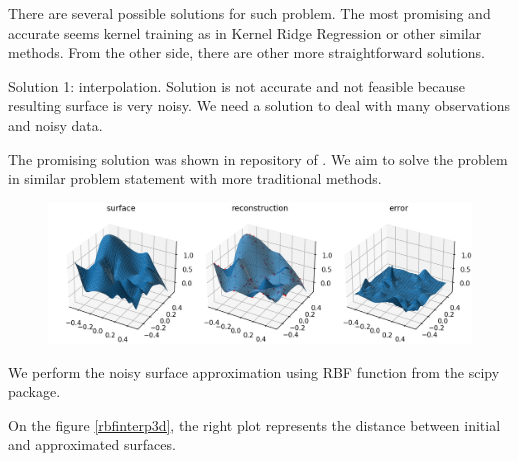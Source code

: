 \documentclass[a4paper, 12pt]{article}
\begin{document}
There are  several possible solutions for such problem. The most promising and accurate seems kernel training as in Kernel Ridge Regression or other similar methods. From the other side, there are other more straightforward solutions.

Solution 1: interpolation. Solution is not accurate and not feasible because resulting surface is very noisy. We need a solution to deal with many observations and noisy data.

The promising solution was shown in repository of \cite{Surface_approximation_GP}. We aim to solve the problem in similar problem statement with more traditional methods.

\begin{figure}
	\centering
	\includegraphics[width=1.0\linewidth]{images/rbfinterp3d}
	\caption{}
	\label{fig:rbfinterp3d}
\end{figure}

We perform the noisy surface approximation using RBF function from the scipy package.

On the figure \ref{rbfinterp3d}, the right plot represents the distance between initial and approximated surfaces.

%	 
%	
%	
%	


\cite{Surface_approximation_GP}



\end{document}
